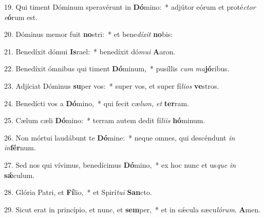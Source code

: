\item 19. Qui timent Dóminum speravérunt in \textbf{Dó}mino:~* adjútor eórum et proté\textit{ctor} \textit{e}\textbf{ó}rum est.
\item 20. Dóminus memor fuit \textbf{no}stri:~* et bene\textit{díxit} \textbf{no}bis:
\item 21. Benedíxit dómui \textbf{Is}rael:~* benedíxit dó\textit{mui} \textbf{A}aron.
\item 22. Benedíxit ómnibus qui timent \textbf{Dó}minum,~* pusíllis \textit{cum} \textit{ma}\textbf{jó}ribus.
\item 23. Adjíciat Dóminus \textbf{su}per vos:~* super vos, et super fí\textit{lios} \textbf{ve}stros.
\item 24. Benedícti vos a \textbf{Dó}mino,~* qui fecit cæ\textit{lum,} \textit{et} \textbf{ter}ram.
\item 25. Cælum cæli \textbf{Dó}mino:~* terram autem dedit fí\textit{liis} \textbf{hó}minum.
\item 26. Non mórtui laudábunt te \textbf{Dó}mine:~* neque omnes, qui descéndunt \textit{in} \textit{in}\textbf{fér}num.
\item 27. Sed nos qui vívimus, benedícimus \textbf{Dó}mino,~* ex hoc nunc et us\textit{que} \textit{in} \textbf{sǽ}culum.
\item 28. Glória Patri, et \textbf{Fí}lio,~* et Spirí\textit{tu}\textit{i} \textbf{San}cto.
\item 29. Sicut erat in princípio, et nunc, et \textbf{sem}per,~* et in sǽcula sæcu\hspace{0.03em}\textit{ló}\textit{rum}. \textbf{A}men.
